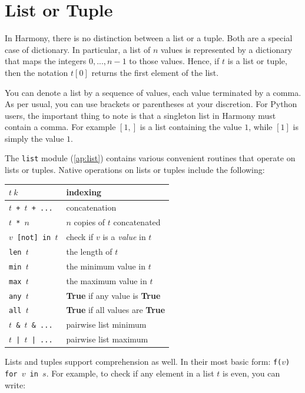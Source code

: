 \documentclass{report}
\begin{document}
\section{List or Tuple}

In Harmony, there is no distinction between a list or a tuple.
Both are a special case of dictionary.  In particular, a list of
$n$ values is represented by a dictionary that maps the integers
$0, ..., n-1$ to those values.  Hence, if $t$ is a list or tuple,
then the notation $t[0]$ returns the first element of the list.

You can denote a list by a sequence of values, each value terminated
by a comma.  As per usual, you can use brackets or parentheses
at your discretion.  For Python users, the important thing to note
is that a singleton list in Harmony must contain a comma.  For
example $[1,]$ is a list containing the value $1$, while $[1]$
is simply the value $1$.

The \texttt{list} module (\autoref{ap:list}) contains various
convenient routines that operate on lists or tuples.
Native operations on lists or tuples include the following:

\begin{center}
\begin{tabular}{|l|l|}
\hline
\texttt{$t~k$} & indexing \\
\hline
\texttt{$t$ + $t$ + ...} & concatenation \\
\hline
\texttt{$t$ * $n$} & $n$ copies of $t$ concatenated \\
\hline
\texttt{$v$ [not] in $t$} & check if $v$ is a \emph{value} in $t$ \\
\hline
\texttt{len $t$} & the length of $t$ \\
\hline
\texttt{min $t$} & the minimum value in $t$ \\
\hline
\texttt{max $t$} & the maximum value in $t$ \\
\hline
\texttt{any $t$} & \textbf{True} if any value is \textbf{True} \\
\hline
\texttt{all $t$} & \textbf{True} if all values are \textbf{True} \\
\hline
\texttt{$t$ \& $t$ \& ...} & pairwise list minimum \\
\hline
\texttt{$t$ | $t$ | ...} & pairwise list maximum \\
\hline
\end{tabular}
\end{center}

Lists and tuples support comprehension as well.
In their most basic form: \texttt{f($v$) for $v$ in $s$}.
For example, to check if any element in a list $t$ is even, you
can write:
\end{document}
